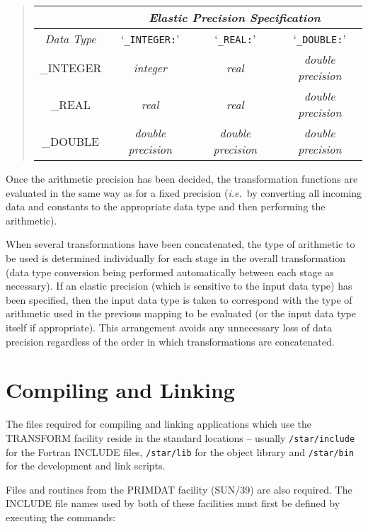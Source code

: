 \documentclass[twoside,11pt]{article}
\newcommand{\xref}[3]{#1}
\newcommand{\xlabel}[1]{}
\newcommand{\name}[1]{\mbox{\small{#1}}}
\begin{document}
\begin{quote}
\begin{center}
\begin{tabular}{|c|c|c|c|}
\cline{2-4}
\multicolumn{1}{c}{} & \multicolumn{3}{|c|}{\em Elastic Precision
Specification}\\
\hline
{\em Data Type} & `\verb#_INTEGER:#' & `\verb#_REAL:#' & `\verb#_DOUBLE:#' \\
\hline
\name{\_INTEGER} & {\em integer} & {\em real} & {\em double precision} \\
\name{\_REAL} & {\em real} & {\em real} & {\em double precision} \\
\name{\_DOUBLE} & {\em double precision} & {\em double precision} & {\em
double precision}\\
\hline 
\end{tabular}
\end{center}
\end{quote} 

Once the arithmetic precision has been decided, the transformation functions
are evaluated in the same way as for a fixed precision (\emph{i.e.}\ by
converting all incoming data and constants to the appropriate data type and
then performing the arithmetic). 

When several transformations have been concatenated, the type of arithmetic
to be used is determined individually for each stage in the overall
transformation (data type conversion being performed automatically between
each stage as necessary). 
If an elastic precision (which is sensitive to the input data type) has been
specified, then the input data type is taken to correspond with the type of
arithmetic used in the previous mapping to be evaluated (or the input data
type itself if appropriate).
This arrangement avoids any unnecessary loss of data precision regardless of
the order in which transformations are concatenated. 


\section{\xlabel{compiling_and_linking}Compiling and Linking}

The files required for compiling and linking applications which use the
\name{TRANSFORM} facility reside in the standard locations -- usually
\texttt{/star/include} for the Fortran \name{INCLUDE} files, 
\texttt{/star/lib} for the object library and \texttt{/star/bin} for the
development and link scripts.

Files and routines from the \name{PRIMDAT} facility (\xref{SUN/39}{sun39}{}) 
are also required. 
The \name{INCLUDE} file names used by both of these facilities must first 
be defined by executing the commands: 
\end{document}
